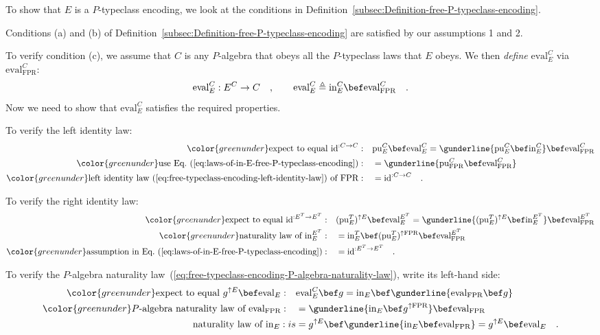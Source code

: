 To show that $E$ is a $P$-typeclass encoding, we look at the conditions
in Definition~\ref{subsec:Definition-free-P-typeclass-encoding}.

Conditions (a) and (b) of Definition~\ref{subsec:Definition-free-P-typeclass-encoding}
are satisfied by our assumptions 1 and 2.

To verify condition (c), we assume that $C$ is any $P$-algebra that
obeys all the $P$-typeclass laws that $E$ obeys. We then \emph{define}
$\text{eval}_{E}^{C}$ via $\text{eval}_{\text{FPR}}^{C}$:
\[
\text{eval}_{E}^{C}:E^{C}\rightarrow C\quad,\quad\quad\text{eval}_{E}^{C}\triangleq\text{in}_{E}^{C}\bef\text{eval}_{\text{FPR}}^{C}\quad.
\]
Now we need to show that $\text{eval}_{E}^{C}$ satisfies the required
properties.

To verify the left identity law:
\begin{align*}
{\color{greenunder}\text{expect to equal }\text{id}^{:C\rightarrow C}:}\quad & \text{pu}_{E}^{C}\bef\text{eval}_{E}^{C}=\gunderline{\text{pu}_{E}^{C}\bef\text{in}_{E}^{C}}\bef\text{eval}_{\text{FPR}}^{C}\\
{\color{greenunder}\text{use Eq.~(\ref{eq:laws-of-in-E-free-P-typeclass-encoding})}:}\quad & =\gunderline{\text{pu}_{\text{FPR}}^{C}\bef\text{eval}_{\text{FPR}}^{C}}\\
{\color{greenunder}\text{left identity law~(\ref{eq:free-typeclass-encoding-left-identity-law}) of }\text{FPR}:}\quad & =\text{id}^{:C\rightarrow C}\quad.
\end{align*}

To verify the right identity law:
\begin{align*}
{\color{greenunder}\text{expect to equal }\text{id}^{:E^{T}\rightarrow E^{T}}:}\quad & (\text{pu}_{E}^{T})^{\uparrow E}\bef\text{eval}_{E}^{E^{T}}=\gunderline{(\text{pu}_{E}^{T})^{\uparrow E}\bef\text{in}_{E}^{E^{T}}}\bef\text{eval}_{\text{FPR}}^{E^{T}}\\
{\color{greenunder}\text{naturality law of }\text{in}_{E}^{E^{T}}:}\quad & =\text{in}_{E}^{T}\bef(\text{pu}_{E}^{T})^{\uparrow\text{FPR}}\bef\text{eval}_{\text{FPR}}^{E^{T}}\\
{\color{greenunder}\text{assumption in Eq.~(\ref{eq:laws-of-in-E-free-P-typeclass-encoding})}:}\quad & =\text{id}^{:E^{T}\rightarrow E^{T}}\quad.
\end{align*}

To verify the $P$-algebra naturality law~(\ref{eq:free-typeclass-encoding-P-algebra-naturality-law}),
write its left-hand side:
\begin{align*}
{\color{greenunder}\text{expect to equal }g^{\uparrow E}\bef\text{eval}_{E}:}\quad & \text{eval}_{E}^{C}\bef g=\text{in}_{E}\bef\gunderline{\text{eval}_{\text{FPR}}\bef g}\\
{\color{greenunder}P\text{-algebra naturality law of }\text{eval}_{\text{FPR}}:}\quad & =\gunderline{\text{in}_{E}\bef g^{\uparrow\text{FPR}}}\bef\text{eval}_{\text{FPR}}\\
\text{naturality law of }\text{in}_{E}:is & =g^{\uparrow E}\bef\gunderline{\text{in}_{E}\bef\text{eval}_{\text{FPR}}}=g^{\uparrow E}\bef\text{eval}_{E}\quad.
\end{align*}

